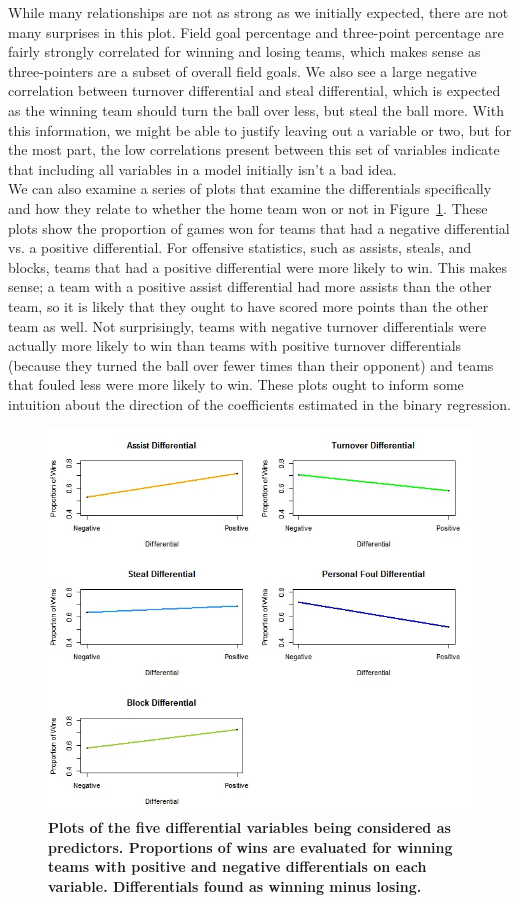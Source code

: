 \documentclass[12pt]{article}\usepackage[]{graphicx}\usepackage[]{color}
\begin{document}
While many relationships are not as strong as we initially expected, there are not many surprises in this plot. Field goal percentage and three-point percentage are fairly strongly correlated for winning and losing teams, which makes sense as three-pointers are a subset of overall field goals. We also see a large negative correlation between turnover differential and steal differential, which is expected as the winning team should turn the ball over less, but steal the ball more. With this information, we might be able to justify leaving out a variable or two, but for the most part, the low correlations present between this set of variables indicate that including all variables in a model initially isn't a bad idea.\\

We can also examine a series of plots that examine the differentials specifically and how they relate to whether the home team won or not in Figure~\ref{fig:diff}. These plots show the proportion of games won for teams that had a negative differential vs. a positive differential. For offensive statistics, such as assists, steals, and blocks, teams that had a positive differential were more likely to win. This makes sense; a team with a positive assist differential had more assists than the other team, so it is likely that they ought to have scored more points than the other team as well. Not surprisingly, teams with negative turnover differentials were actually more likely to win than teams with positive turnover differentials (because they turned the ball over fewer times than their opponent) and teams that fouled less were more likely to win. These plots ought to inform some intuition about the direction of the coefficients estimated in the binary regression. \\

\begin{figure}[h]
\centering
\includegraphics[width=.7\textwidth]{differentials.jpeg}
\captionsetup{font=footnotesize,labelfont=footnotesize}
\caption{\label{fig:diff} \textbf{Plots of the five differential variables being considered as predictors. Proportions of wins are evaluated for winning teams with positive and negative differentials on each variable. Differentials found as winning minus losing.}}
\end{figure}
\end{document}
